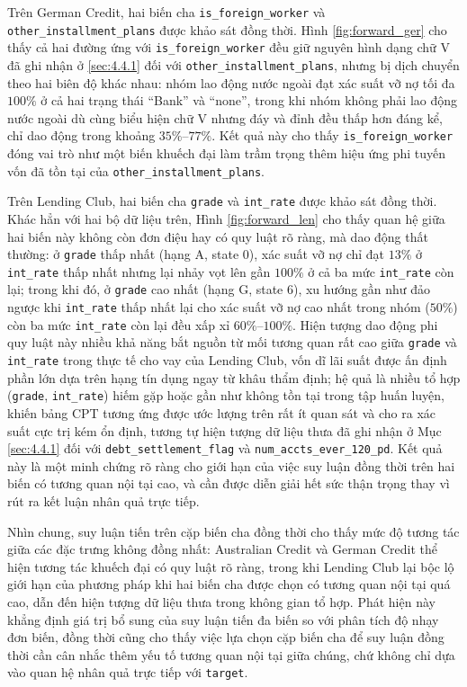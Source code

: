 Trên German Credit, hai biến cha \texttt{is\_foreign\_worker} và \texttt{other\_installment\_plans} được khảo sát đồng thời. Hình \ref{fig:forward_ger} cho thấy cả hai đường ứng với \texttt{is\_foreign\_worker} đều giữ nguyên hình dạng chữ V đã ghi nhận ở \ref{sec:4.4.1} đối với \texttt{other\_installment\_plans}, nhưng bị dịch chuyển theo hai biên độ khác nhau: nhóm lao động nước ngoài đạt xác suất vỡ nợ tối đa $100\%$ ở cả hai trạng thái ``Bank'' và ``none'', trong khi nhóm không phải lao động nước ngoài dù cùng biểu hiện chữ V nhưng đáy và đỉnh đều thấp hơn đáng kể, chỉ dao động trong khoảng $35\%$--$77\%$. Kết quả này cho thấy \texttt{is\_foreign\_worker} đóng vai trò như một biến khuếch đại làm trầm trọng thêm hiệu ứng phi tuyến vốn đã tồn tại của \texttt{other\_installment\_plans}.

Trên Lending Club, hai biến cha \texttt{grade} và \texttt{int\_rate} được khảo sát đồng thời. Khác hẳn với hai bộ dữ liệu trên, Hình \ref{fig:forward_len} cho thấy quan hệ giữa hai biến này không còn đơn điệu hay có quy luật rõ ràng, mà dao động thất thường: ở \texttt{grade} thấp nhất (hạng A, state 0), xác suất vỡ nợ chỉ đạt $13\%$ ở \texttt{int\_rate} thấp nhất nhưng lại nhảy vọt lên gần $100\%$ ở cả ba mức \texttt{int\_rate} còn lại; trong khi đó, ở \texttt{grade} cao nhất (hạng G, state 6), xu hướng gần như đảo ngược khi \texttt{int\_rate} thấp nhất lại cho xác suất vỡ nợ cao nhất trong nhóm ($50\%$) còn ba mức \texttt{int\_rate} còn lại đều xấp xỉ $60\%$--$100\%$. Hiện tượng dao động phi quy luật này nhiều khả năng bắt nguồn từ mối tương quan rất cao giữa \texttt{grade} và \texttt{int\_rate} trong thực tế cho vay của Lending Club, vốn dĩ lãi suất được ấn định phần lớn dựa trên hạng tín dụng ngay từ khâu thẩm định; hệ quả là nhiều tổ hợp (\texttt{grade}, \texttt{int\_rate}) hiếm gặp hoặc gần như không tồn tại trong tập huấn luyện, khiến bảng CPT tương ứng được ước lượng trên rất ít quan sát và cho ra xác suất cực trị kém ổn định, tương tự hiện tượng dữ liệu thưa đã ghi nhận ở Mục \ref{sec:4.4.1} đối với \texttt{debt\_settlement\_flag} và \texttt{num\_accts\_ever\_120\_pd}. Kết quả này là một minh chứng rõ ràng cho giới hạn của việc suy luận đồng thời trên hai biến có tương quan nội tại cao, và cần được diễn giải hết sức thận trọng thay vì rút ra kết luận nhân quả trực tiếp.

Nhìn chung, suy luận tiến trên cặp biến cha đồng thời cho thấy mức độ tương tác giữa các đặc trưng không đồng nhất: Australian Credit và German Credit thể hiện tương tác khuếch đại có quy luật rõ ràng, trong khi Lending Club lại bộc lộ giới hạn của phương pháp khi hai biến cha được chọn có tương quan nội tại quá cao, dẫn đến hiện tượng dữ liệu thưa trong không gian tổ hợp. Phát hiện này khẳng định giá trị bổ sung của suy luận tiến đa biến so với phân tích độ nhạy đơn biến, đồng thời cũng cho thấy việc lựa chọn cặp biến cha để suy luận đồng thời cần cân nhắc thêm yếu tố tương quan nội tại giữa chúng, chứ không chỉ dựa vào quan hệ nhân quả trực tiếp với \texttt{target}.

